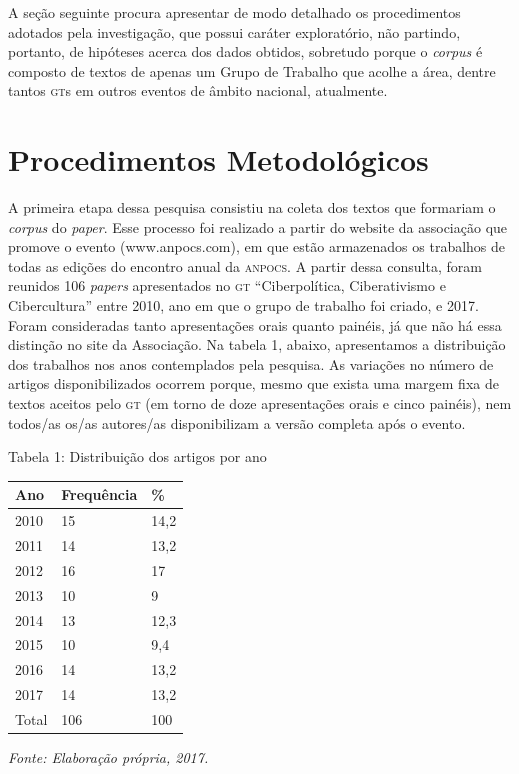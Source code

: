 A seção seguinte procura apresentar de modo detalhado os procedimentos
adotados pela investigação, que possui caráter exploratório, não
partindo, portanto, de hipóteses acerca dos dados obtidos, sobretudo
porque o \emph{corpus} é composto de textos de apenas um Grupo de
Trabalho que acolhe a área, dentre tantos \textsc{gt}s em outros eventos de
âmbito nacional, atualmente.

\section{Procedimentos Metodológicos}

A primeira etapa dessa pesquisa consistiu na coleta dos textos que
formariam o \emph{corpus} do \emph{paper}. Esse processo foi realizado a
partir do website da associação que promove o evento (www.anpocs.com),
em que estão armazenados os trabalhos de todas as edições do encontro
anual da \textsc{anpocs}. A partir dessa consulta, foram reunidos 106
\emph{papers} apresentados no \textsc{gt} ``Ciberpolítica, Ciberativismo e
Cibercultura'' entre 2010, ano em que o grupo de trabalho foi criado, e
2017. Foram consideradas tanto apresentações orais quanto painéis, já
que não há essa distinção no site da Associação. Na tabela 1, abaixo,
apresentamos a distribuição dos trabalhos nos anos contemplados pela
pesquisa. As variações no número de artigos disponibilizados ocorrem
porque, mesmo que exista uma margem fixa de textos aceitos pelo \textsc{gt} (em
torno de doze apresentações orais e cinco painéis), nem todos/as os/as
autores/as disponibilizam a versão completa após o evento.

\begin{center}
Tabela 1: Distribuição dos artigos por ano
\end{center}

\begin{center}
\centering
\begin{tabular}{|l|l|l|}
\hline
Ano & Frequência & \% \\ \hline
2010 & 15 & 14,2 \\ \hline
2011 & 14 & 13,2 \\ \hline
2012 & 16 & 17 \\ \hline
2013 & 10 & 9 \\ \hline
2014 & 13 & 12,3 \\ \hline
2015 & 10 & 9,4 \\ \hline
2016 & 14 & 13,2 \\ \hline
2017 & 14 & 13,2 \\ \hline
Total & 106 & 100 \\ \hline
\end{tabular}
\end{center}
\begin{center}
{\footnotesize\emph{Fonte: Elaboração própria, 2017.}}
\end{center}

